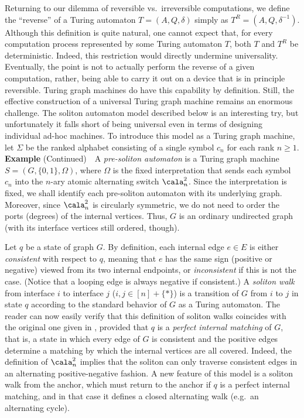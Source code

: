 \documentclass{eptcs}
\begin{document}
Returning to our dilemma of reversible vs.\ irreversible computations, we define the
``reverse'' of a Turing automaton $T=(A,Q,\delta )$ simply as $T^R=(A,Q,\delta ^{-1})$.
Although this definition is quite natural, one cannot expect that, for every computation
process represented by some Turing automaton $T$, both $T$ and $T^R$ be deterministic.
Indeed, this restriction would directly undermine universality. Eventually,
the point is not to actually perform the reverse of a given computation,
rather, being able to carry it out on a device that is in principle 
reversible. Turing graph machines do have this capability by definition.
Still, the effective construction of a universal Turing graph
machine remains an enormous challenge. The soliton automaton model described
below is an interesting try, but unfortunately it falls short of being universal
even in terms of designing individual ad-hoc machines.
To introduce this model as a Turing graph machine, let $\Sigma $ be the
ranked alphabet consisting of a single symbol $c_n$ for each rank $n\geq 1$.
\vspp\newline
{\bf Example} (Continued)\ \   A {\em pre-soliton automaton\/} is a Turing graph
machine $S=(G,\{0,1\},\Omega )$, where $\Omega $ is the fixed interpretation
that sends each symbol $c_n$ into the $n$-ary atomic alternating 
switch $\cala ^2_n$. 
Since the interpretation is fixed, we shall
identify each pre-soliton automaton with its underlying graph. Moreover, since
$\cala ^2_n$ is circularly symmetric, we do not need to
order the ports (degrees) of the internal vertices. Thus, $G$ is an ordinary undirected
graph (with its interface vertices still ordered, though). 
\vsp

Let $q$ be a state of graph $G$. By definition, each internal edge $e\in E$ is either {\em consistent\/}
with respect to $q$, meaning that $e$ has the same sign (positive or negative) viewed from its two
internal endpoints, or {\em inconsistent\/} if this is not the case. 
(Notice that a looping edge is always negative if consistent.) A {\em soliton walk\/}
from interface $i$ to interface $j$ ($i,j\in [n]+\{*\}$) is a transition of $G$ from $i$ to $j$
in state $q$ according to the standard behavior of $G$ as a Turing automaton. The 
reader can now easily verify that this definition of soliton walks coincides with the
original one given in \cite{das}, provided that $q$ is a {\em perfect internal matching\/} 
\cite {lov,tcss}
of $G$, that is, a state in which every edge of $G$ is consistent and the positive edges
determine a matching by which the internal vertices are all covered. Indeed, the definition
of $\cala ^2_n$ implies that the soliton can only traverse consistent
edges in an alternating positive-negative fashion.  A new feature of this model is a soliton
walk from the anchor, which must return to the anchor if $q$ is a perfect internal matching,
and in that case it defines a closed alternating walk (e.g.\ an alternating
cycle).
\end{document}
